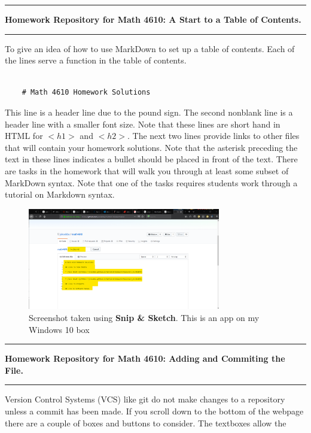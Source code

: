 \documentclass[10pt,fleqn]{article}
\begin{document}
\eject
\vskip0.1in\hrule\vskip0.1in
\noindent
{\bf Homework Repository for Math 4610: A Start to a Table of Contents.} 
\vskip0.1in\hrule\vskip0.1in
To give an idea of how to use MarkDown to set up a table of contents. Each of
the lines serve a function in the table of contents.
\begin{verbatim}

    # Math 4610 Homework Solutions

\end{verbatim}
This line is a header line due to the pound sign. The second nonblank line is a
header line with a smaller font size. Note that these lines are short hand in
HTML for $<h1>$ and $<h2>$. The next two lines provide links to other files that
will contain your homework solutions. Note that the asterisk preceding the text
in these lines indicates a bullet should be placed in front of the text. There
are tasks in the homework that will walk you through at least some subset of
MarkDown syntax. Note that one of the tasks requires students work through a
tutorial on Markdown syntax.
\vfill
\begin{figure}[h]
\centering
\includegraphics[width=0.75\textwidth]{../images/github_06.png}
\caption{{Screenshot} taken using {\bf Snip \& Sketch}. This is an app on
         my Windows 10 box}
\end{figure}
\eject
\vskip0.1in\hrule\vskip0.1in
\noindent
{\bf Homework Repository for Math 4610: Adding and Commiting the File.} 
\vskip0.1in\hrule\vskip0.1in
Version Control Systems (VCS) like git do not make changes to a repository 
unless a commit has been made. If you scroll down to the bottom of the webpage
there are a couple of boxes and buttons to consider. The textboxes allow the
\end{document}
